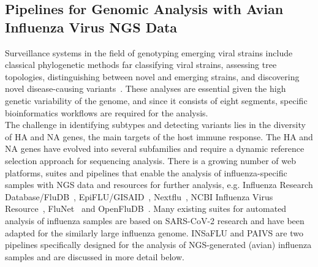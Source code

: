 \subsection{Pipelines for Genomic Analysis with Avian Influenza Virus NGS Data}\label{sec:2-aiv-pipelines}
Surveillance systems in the field of genotyping emerging viral strains include classical phylogenetic methods far classifying viral strains, assessing tree topologies, distinguishing between novel and emerging strains, and discovering novel disease-causing variants~\cite{koboldt2013next}. These analyses are essential given the high genetic variability of the genome, and since it consists of eight segments, specific bioinformatics workflows are required for the analysis. \\
The challenge in identifying subtypes and detecting variants lies in the diversity of \ac{HA} and \ac{NA} genes, the main targets of the host immune response. The \ac{HA} and \ac{NA} genes have evolved into several subfamilies and require a dynamic reference selection approach for sequencing analysis. There is a growing number of web platforms, suites and pipelines that enable the analysis of influenza-specific samples with \ac{NGS} data and resources for further analysis, e.g. Influenza Research Database/FluDB~\cite{zhang2017influenza}, EpiFLU/GISAID~\cite{shu2017gisaid}, Nextflu~\cite{neher2015nextflu}, NCBI Influenza Virus Resource~\cite{bao2008influenza}, FluNet~\cite{flahault1998flunet} and OpenFluDB~\cite{liechti2010openfludb}. Many existing suites for automated analysis of influenza samples are based on \ac{SARS-CoV-2} research and have been adapted for the similarly large influenza genome. \ac{INSaFLU} and \ac{PAIVS} are two pipelines specifically designed for the analysis of \ac{NGS}-generated (avian) influenza samples and are discussed in more detail below.

